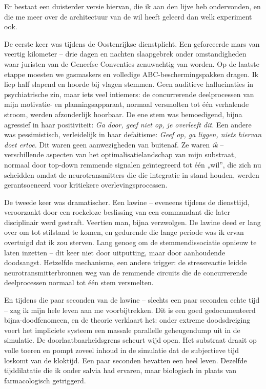 \documentclass[11pt, twoside, openright]{book}
\begin{document}
Er bestaat een duisterder versie hiervan, die ik aan den lijve heb ondervonden, en die me meer over de architectuur van de wil heeft geleerd dan welk experiment ook.

De eerste keer was tijdens de Oostenrijkse dienstplicht. Een geforceerde mars van veertig kilometer -- drie dagen en nachten slaapgebrek onder omstandigheden waar juristen van de Geneefse Conventies zenuwachtig van worden. Op de laatste etappe moesten we gasmaskers en volledige ABC-beschermingspakken dragen. Ik liep half slapend en hoorde bij vlagen stemmen. Geen auditieve hallucinaties in psychiatrische zin, maar iets veel intiemers: de concurrerende deelprocessen van mijn motivatie- en planningsapparaat, normaal versmolten tot één verhalende stroom, werden afzonderlijk hoorbaar. De ene stem was bemoedigend, bijna agressief in haar positiviteit: \textit{Ga door, geef niet op, je overleeft dit.} Een andere was pessimistisch, verleidelijk in haar defaitisme: \textit{Geef op, ga liggen, niets hiervan doet ertoe.} Dit waren geen aanwezigheden van buitenaf. Ze waren \textit{ik} -- verschillende aspecten van het optimalisatielandschap van mijn substraat, normaal door top-down remmende signalen geïntegreerd tot één „wil”, die zich nu scheidden omdat de neurotransmitters die die integratie in stand houden, werden gerantsoeneerd voor kritiekere overlevingsprocessen.

De tweede keer was dramatischer. Een lawine -- eveneens tijdens de diensttijd, veroorzaakt door een roekeloze beslissing van een commandant die later disciplinair werd gestraft. Veertien man, bijna verzwolgen. De lawine deed er lang over om tot stilstand te komen, en gedurende die lange periode was ik ervan overtuigd dat ik zou sterven. Lang genoeg om de stemmendissociatie opnieuw te laten inzetten -- dit keer niet door uitputting, maar door aanhoudende doodsangst. Hetzelfde mechanisme, een andere trigger: de stressreactie leidde neurotransmitterbronnen weg van de remmende circuits die de concurrerende deelprocessen normaal tot één stem versmelten.

En tijdens die paar seconden van de lawine -- slechts een paar seconden echte tijd -- zag ik mijn hele leven aan me voorbijtrekken. Dit is een goed gedocumenteerd bijna-doodfenomeen, en de theorie verklaart het: onder extreme doodsdreiging voert het impliciete systeem een massale parallelle geheugendump uit in de simulatie. De doorlaatbaarheidsgrens scheurt wijd open. Het substraat draait op volle toeren en pompt zoveel inhoud in de simulatie dat de subjectieve tijd loskomt van de kloktijd. Een paar seconden bevatten een heel leven. Dezelfde tijddilatatie die ik onder salvia had ervaren, maar biologisch in plaats van farmacologisch getriggerd.
\end{document}
